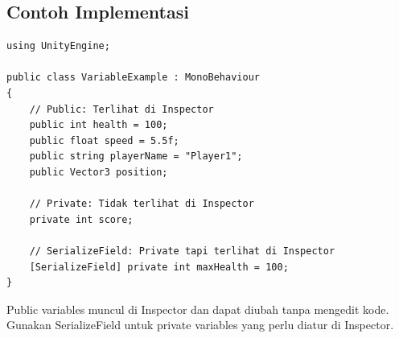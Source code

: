 \subsection{Contoh Implementasi}

\begin{lstlisting}[language={[Sharp]C}]
using UnityEngine;

public class VariableExample : MonoBehaviour
{
    // Public: Terlihat di Inspector
    public int health = 100;
    public float speed = 5.5f;
    public string playerName = "Player1";
    public Vector3 position;
    
    // Private: Tidak terlihat di Inspector
    private int score;
    
    // SerializeField: Private tapi terlihat di Inspector
    [SerializeField] private int maxHealth = 100;
}
\end{lstlisting}

\begin{catatan}
Public variables muncul di Inspector dan dapat diubah tanpa mengedit kode. Gunakan SerializeField untuk private variables yang perlu diatur di Inspector.
\end{catatan}

